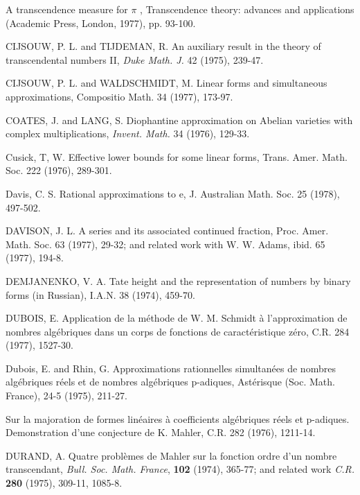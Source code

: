 \begin{hanglist}
    \item \hspace{1.5em} A transcendence measure for  $\pi$ , Transcendence theory: advances and applications (Academic Press, London, 1977), pp. 93-100.
    \item CIJSOUW, P. L. and TIJDEMAN, R. An auxiliary result in the theory of transcendental numbers II, \textit{Duke Math. J.} 42 (1975), 239-47.
    \item CIJSOUW, P. L. and WALDSCHMIDT, M. Linear forms and simultaneous approximations, Compositio Math. 34 (1977), 173-97.
    \item COATES, J. and LANG, S. Diophantine approximation on Abelian varieties with complex multiplications, \textit{Invent. Math.} 34 (1976), 129-33.
    \item Cusick, T, W. Effective lower bounds for some linear forms, Trans. Amer. Math. Soc. 222 (1976), 289-301.
    \item Davis, C. S. Rational approximations to e, J. Australian Math. Soc. 25 (1978), 497-502.
    \item DAVISON, J. L. A series and its associated continued fraction, Proc. Amer. Math. Soc. 63 (1977), 29-32; and related work with W. W. Adams, ibid. 65 (1977), 194-8.
    \item DEMJANENKO, V. A. Tate height and the representation of numbers by binary forms (in Russian), I.A.N. 38 (1974), 459-70.
    \item DUBOIS, E. Application de la méthode de W. M. Schmidt à l'approximation de nombres algébriques dans un corps de fonctions de caractéristique zéro, C.R. 284 (1977), 1527-30.
    \item Dubois, E. and Rhin, G. Approximations rationnelles simultanées de nombres algébriques réels et de nombres algébriques p-adiques, Astérisque (Soc. Math. France), 24-5 (1975), 211-27.
    \item \hspace{1.5em} Sur la majoration de formes linéaires à coefficients algébriques réels et p-adiques. Demonstration d'une conjecture de K. Mahler, C.R. 282 (1976), 1211-14.
    \item DURAND, A. Quatre problèmes de Mahler sur la fonction ordre d'un nombre transcendant, \textit{Bull. Soc. Math. France}, \textbf{102} (1974), 365-77; and related work \textit{C.R.} \textbf{280} (1975), 309-11, 1085-8.

\end{hanglist}
